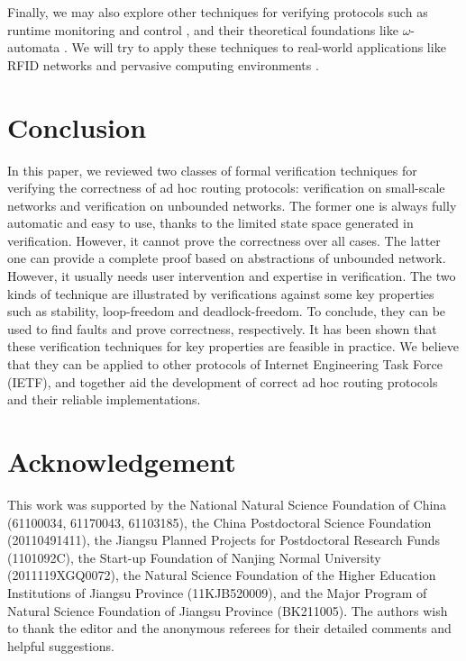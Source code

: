 \documentclass[a4paper,10pt,twocolumn]{article}
\begin{document}
Finally, we may also explore other techniques for verifying protocols such as runtime monitoring and control \cite{CM10a,CM09d}, and their theoretical foundations like $\omega$-automata \cite{Chen11}. We will try to apply these techniques to real-world applications like RFID networks \cite{ZZG11} and pervasive computing environments \cite{ZCH11,ZZL12}.

\section{Conclusion}
\label{Sec:conc}
In this paper, we reviewed two classes of formal verification techniques for verifying the correctness of ad hoc routing protocols: verification on small-scale networks and verification on unbounded networks. The former one is always fully automatic and easy to use, thanks to the limited state space generated in verification. However, it cannot prove the correctness over all cases. The latter one can provide a complete proof based on abstractions of unbounded network. However, it usually needs user intervention and expertise in verification. The two kinds of technique are illustrated by verifications against some key properties such as stability, loop-freedom and deadlock-freedom. To conclude, they can be used to find faults and prove correctness, respectively. It has been shown that these verification techniques for key properties are feasible in practice. We believe that they can be applied to other protocols of Internet Engineering Task Force (IETF), and together aid the development of correct ad hoc routing protocols and their reliable implementations.

\section*{Acknowledgement}
This work was supported by the National Natural Science Foundation of China (61100034, 61170043, 61103185), the China Postdoctoral Science Foundation (20110491411), the Jiangsu Planned Projects for Postdoctoral Research Funds (1101092C), the Start-up Foundation of Nanjing Normal University (2011119XGQ0072), the Natural Science Foundation of the Higher Education Institutions of Jiangsu Province (11KJB520009), and the Major Program of Natural Science Foundation of Jiangsu Province (BK211005). The authors wish to thank the editor and the anonymous referees for their detailed comments and helpful suggestions.



\end{document}
